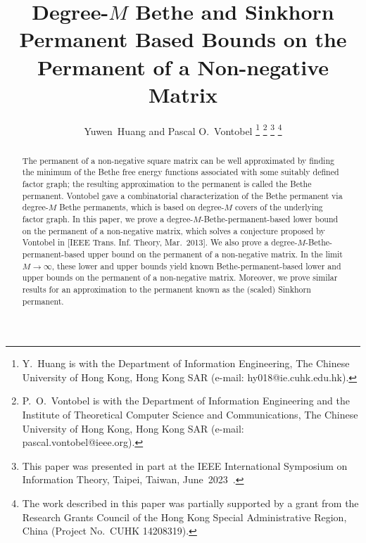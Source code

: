 \documentclass[journal,lettersize,twocolumn]{IEEEtran} %
\begin{document}
%

%
%

%
%
%
%

%
%
%
%

%

%

%
%

\title{Degree-$M$ Bethe and Sinkhorn Permanent Based Bounds on
       the Permanent of a Non-negative Matrix}

%

\author{Yuwen~Huang and Pascal O.\ Vontobel%
	\thanks{Y.~Huang is with the 
          Department of Information Engineering,
          The Chinese University of Hong Kong, Hong Kong SAR
          (e-mail: hy018@ie.cuhk.edu.hk).}%
	\thanks{P.\ O.\ Vontobel is with the 
		Department of Information Engineering and 
		the Institute of Theoretical Computer Science and Communications,
		The Chinese University of Hong Kong, Hong Kong SAR
		(e-mail: pascal.vontobel@ieee.org).}%
  \thanks{This paper was presented in part at the IEEE International Symposium
    on Information Theory, Taipei, Taiwan, June~2023~\cite{Huang2023ISIT}.}%
  \thanks{The work described in this paper was partially supported by a grant
    from the Research Grants Council of the Hong Kong Special Administrative
    Region, China (Project No.\ CUHK 14208319).}%
}

%
%

\maketitle
%

%

\begin{abstract}
	The permanent of a non-negative square matrix can be well approximated by
  finding the minimum of the Bethe free energy functions associated with some
  suitably defined factor graph; the resulting approximation to the permanent
  is called the Bethe permanent. Vontobel gave a combinatorial
  characterization of the Bethe permanent via degree-$M$ Bethe permanents,
  which is based on degree-$M$ covers of the underlying factor graph. In this
  paper, we prove a degree-$M$-Bethe-permanent-based lower bound on the
  permanent of a non-negative matrix, which solves a conjecture proposed by
  Vontobel in [IEEE Trans. Inf. Theory, Mar.\ 2013]. We also prove a
  degree-$M$-Bethe-permanent-based upper bound on the permanent of a
  non-negative matrix. In the limit $M \to \infty$, these lower and upper
  bounds yield known Bethe-permanent-based lower and upper bounds on the
  permanent of a non-negative matrix. Moreover, we prove similar results for
  an approximation to the permanent known as the (scaled) Sinkhorn permanent.
\end{abstract}
\end{document}
